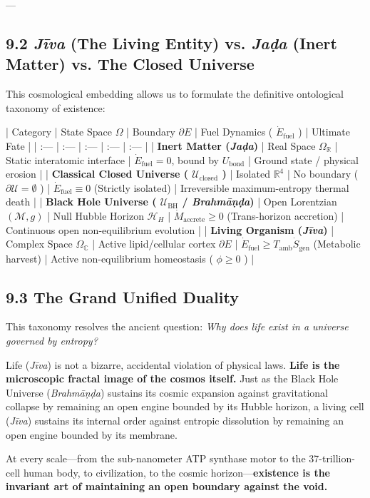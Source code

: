 \documentclass[11pt,a4paper]{article}
\theoremstyle{definition}
\theoremstyle{remark}
\begin{document}
---

\subsection{9.2 \textit{Jīva} (The Living Entity) vs. \textit{Jaḍa} (Inert Matter) vs. The Closed Universe}
This cosmological embedding allows us to formulate the definitive ontological taxonomy of existence:

| Category | State Space $\Omega$ | Boundary $\partial E$ | Fuel Dynamics ( $\dot{E}_{\text{fuel}}$ ) | Ultimate Fate |
| :--- | :--- | :--- | :--- | :--- |
| \textbf{Inert Matter (\textit{Jaḍa})} | Real Space $\Omega_{\mathbb{R}}$ | Static interatomic interface | $\dot{E}_{\text{fuel}} = 0$, bound by $U_{\text{bond}}$ | Ground state / physical erosion |
| \textbf{Classical Closed Universe ( $\mathcal{U}_{\text{closed}}$ )} | Isolated $\mathbb{R}^4$ | No boundary ( $\partial \mathcal{U} = \emptyset$ ) | $\dot{E}_{\text{fuel}} \equiv 0$ (Strictly isolated) | Irreversible maximum-entropy thermal death |
| \textbf{Black Hole Universe ( $\mathcal{U}_{\text{BH}}$ / \textit{Brahmāṇḍa})} | Open Lorentzian $(\mathcal{M}, g)$ | Null Hubble Horizon $\mathcal{H}_H$ | $\dot{M}_{\text{accrete}} \ge 0$ (Trans-horizon accretion) | Continuous open non-equilibrium evolution |
| \textbf{Living Organism (\textit{Jīva})} | Complex Space $\Omega_{\mathbb{C}}$ | Active lipid/cellular cortex $\partial E$ | $\dot{E}_{\text{fuel}} \ge T_{\text{amb}}\dot{S}_{\text{gen}}$ (Metabolic harvest) | Active non-equilibrium homeostasis ( $\phi \ge 0$ ) |

\subsection{9.3 The Grand Unified Duality}
This taxonomy resolves the ancient question: \textit{Why does life exist in a universe governed by entropy?}

Life (\textit{Jīva}) is not a bizarre, accidental violation of physical laws. \textbf{Life is the microscopic fractal image of the cosmos itself.} Just as the Black Hole Universe (\textit{Brahmāṇḍa}) sustains its cosmic expansion against gravitational collapse by remaining an open engine bounded by its Hubble horizon, a living cell (\textit{Jīva}) sustains its internal order against entropic dissolution by remaining an open engine bounded by its membrane.

At every scale—from the sub-nanometer ATP synthase motor to the 37-trillion-cell human body, to civilization, to the cosmic horizon—\textbf{existence is the invariant art of maintaining an open boundary against the void.}
\end{document}
